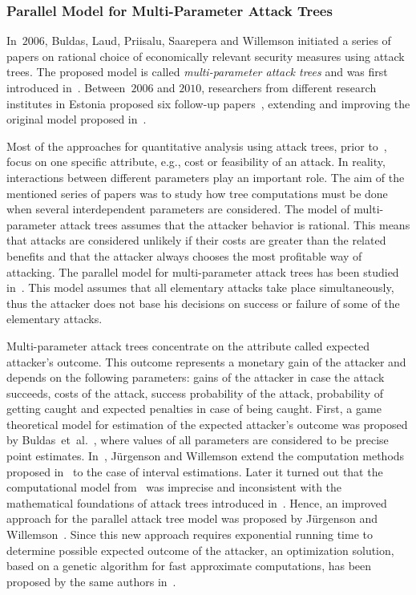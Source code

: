 \documentclass[a4paper]{article}
\begin{document}
\subsubsection{Parallel Model for Multi-Parameter Attack Trees} 
\label{sec:multi-parameter_attack_trees}

In~$2006$, Buldas, Laud, Priisalu, Saarepera and Willemson initiated a series of
papers on rational choice of economically relevant security measures using
attack trees. The proposed model is called \emph{multi-parameter attack trees}
and was first introduced in~\cite{BuLaPrSaWi}. Between~$2006$ and $2010$,
researchers from different research institutes in Estonia proposed six follow-up
papers~\cite{BuTr,JuWi,JuWi3,WiJu,JuWi2,Niit}, extending and improving the
original model proposed in~\cite{BuLaPrSaWi}.

Most of the approaches for quantitative analysis using attack trees, prior
to~\cite{BuLaPrSaWi}, focus on one specific attribute, e.g., cost or feasibility
of an attack. In reality, interactions between different parameters play an
important role. The aim of the mentioned series of papers was to study how tree
computations must be done when several interdependent parameters are considered.
The model of multi-parameter attack trees assumes that the attacker behavior is
rational. This means that attacks are considered unlikely if their costs are
greater than the related benefits and that the attacker always chooses the most
profitable way of attacking. The parallel model for multi-parameter attack trees
has been studied in~\cite{BuLaPrSaWi,BuTr,JuWi,JuWi3,JuWi2,Jurg}. This model
assumes that all elementary attacks take place simultaneously, thus the attacker
does not base his decisions on success or failure of some of the elementary
attacks.

Multi-parameter attack trees concentrate on the attribute called expected
attacker's outcome. This outcome represents a monetary gain of the attacker and
depends on the following parameters: gains of the attacker in case the attack
succeeds, costs of the attack, success probability of the attack, probability of
getting caught and expected penalties in case of being caught. First, a game
theoretical model for estimation of the expected attacker's outcome was proposed
by Buldas~et~al.~\cite{BuLaPrSaWi}, where values of all parameters are
considered to be precise point estimates. In~\cite{JuWi}, J\"{u}rgenson and
Willemson extend the computation methods proposed in~\cite{BuLaPrSaWi} to the
case of interval estimations. Later it turned out that the computational model
from~\cite{BuLaPrSaWi} was imprecise and inconsistent with the mathematical
foundations of attack trees introduced in~\cite{MaOo}. Hence, an improved
approach for the parallel attack tree model was proposed by J\"{u}rgenson and
Willemson~\cite{JuWi3}. Since this new approach requires exponential running
time to determine possible expected outcome of the attacker, an optimization
solution, based on a genetic algorithm for fast approximate computations, has
been proposed by the same authors in~\cite{JuWi2}.
\end{document}

